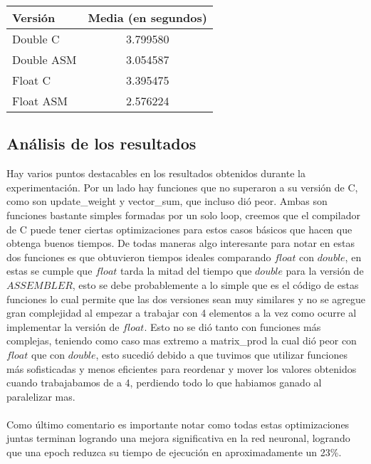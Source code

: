 \begin{center}
    \begin{tabular}{| l | c |}
                \hline
    Versión & Media (en segundos) \\
                \hline
    Double C & 3.799580 \\
    Double ASM & 3.054587 \\
    Float C & 3.395475 \\
    Float ASM  & 2.576224 \\
                \hline
            
        \end{tabular}
\end{center}

\subsection{Análisis de los resultados}

Hay varios puntos destacables en los resultados obtenidos durante la experimentación. Por un lado hay funciones que no superaron a su versión de C, como son update\_weight y vector\_sum, que incluso dió peor. Ambas son funciones bastante simples formadas por un solo loop, creemos que el compilador de C puede tener ciertas optimizaciones para estos casos básicos que hacen que obtenga buenos tiempos. De todas maneras algo interesante para notar en estas dos funciones es que obtuvieron tiempos ideales comparando $float$ con $double$, en estas se cumple que $float$ tarda la mitad del tiempo que $double$ para la versión de $ASSEMBLER$, esto se debe probablemente a lo simple que es el código de estas funciones lo cual permite que las dos versiones sean muy similares y no se agregue gran complejidad al empezar a trabajar con 4 elementos a la vez como ocurre al implementar la versión de $float$. Esto no se dió tanto con funciones más complejas, teniendo como caso mas extremo a matrix\_prod la cual dió peor con $float$ que con $double$, esto sucedió debido a que tuvimos que utilizar funciones más sofisticadas y menos eficientes para reordenar y mover los valores obtenidos cuando trabajabamos de a 4, perdiendo todo lo que habiamos ganado al paralelizar mas.
\\
\\
Como último comentario es importante notar como todas estas optimizaciones juntas terminan logrando una mejora significativa en la red neuronal, logrando que una epoch reduzca su tiempo de ejecución en aproximadamente un 23\%.